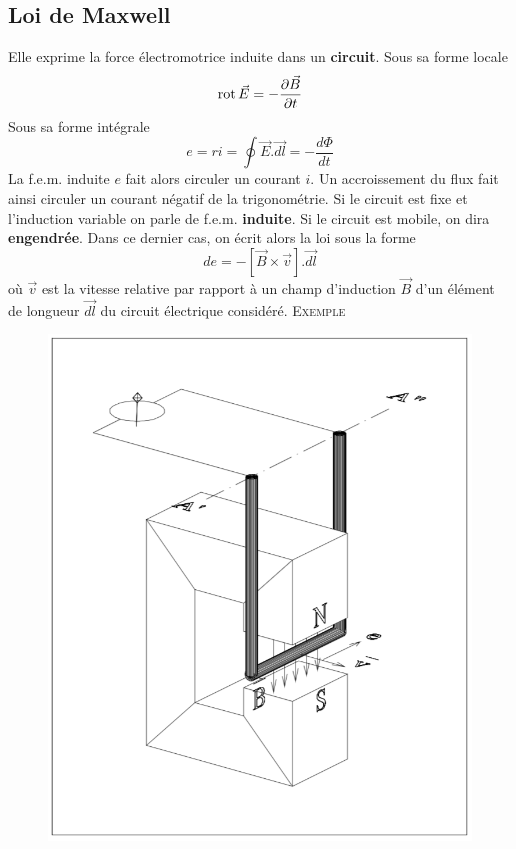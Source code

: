 	\subsection{Loi de Maxwell}
	Elle exprime la force électromotrice induite dans un \textbf{circuit}. 
	Sous sa forme locale 
	\begin{equation}
	\rot \vec{E} = -\frac{\partial \vec{B}}{\partial t}
	\end{equation}
	Sous sa forme intégrale 
	\begin{equation}
	e = ri = \oint \vec{E}.\vec{dl} = -\frac{d\Phi}{dt}
	\end{equation}
	La f.e.m. induite $e$ fait alors circuler un courant $i$. Un 
	accroissement du flux fait ainsi circuler un courant négatif de la trigonométrie. 		Si le circuit est fixe et l'induction 
	variable on parle de f.e.m. \textbf{induite}. Si le circuit est 
	mobile, on dira \textbf{engendrée}. Dans ce dernier cas, on écrit 
	alors la loi sous la forme
	\begin{equation}
	de = -[\vec{B}\times\vec{v}].\vec{dl}
	\end{equation}
	où $\vec{v}$ est la vitesse relative par rapport à un champ d'induction 
	$\vec{B}$ d'un élément de longueur $\vec{dl}$ du circuit électrique 
	considéré.
	\newpage
	\textsc{Exemple}
	\begin{figure}
	\vspace{-5mm}
	\includegraphics[scale=0.25]{ch2/image1} 
	\end{figure}
